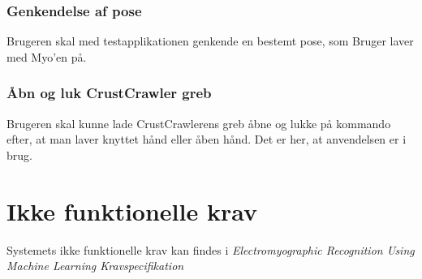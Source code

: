 \subsubsection{Genkendelse af pose}
Brugeren skal med testapplikationen genkende en bestemt pose, som Bruger laver med Myo'en på.
\subsubsection{Åbn og luk CrustCrawler greb}
Brugeren skal kunne lade CrustCrawlerens greb åbne og lukke på kommando efter, at man laver knyttet hånd eller åben hånd. Det er her, at anvendelsen er i brug.

\section{Ikke funktionelle krav}
\label{sec:ikkefunktionellekrav}
Systemets ikke funktionelle krav kan findes i \textit{Electromyographic Recognition Using Machine Learning Kravspecifikation}\citep{RefWorks:8}